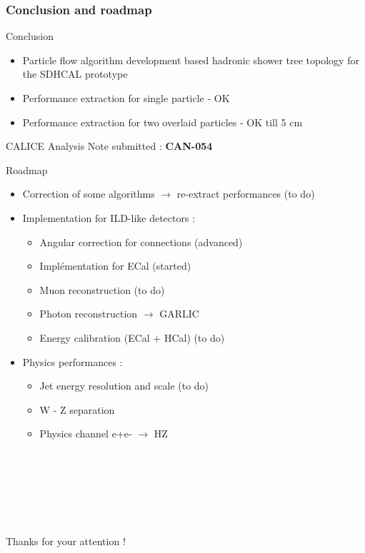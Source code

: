 \documentclass[8pt]{beamer}
\begin{document}
  \begin{frame}
  \frametitle{Conclusion and roadmap}
    \begin{block}{Conclusion}
      \begin{itemize}
        \item Particle flow algorithm development based hadronic shower tree topology for the SDHCAL prototype
        \item Performance extraction for single particle - OK
        \item Performance extraction for two overlaid particles - OK till 5 cm
      \end{itemize}
      CALICE Analysis Note submitted : \textbf{CAN-054}
    \end{block}
    \begin{block}{Roadmap}
      \begin{itemize}
        \item Correction of some algorithms $\rightarrow$ re-extract performances (to do)
        \item Implementation for ILD-like detectors :
        \begin{itemize}
          \item Angular correction for connections (advanced)
          \item Implémentation for ECal (started)
          \item Muon reconstruction (to do)
          \item Photon reconstruction $\rightarrow$ GARLIC
          \item Energy calibration (ECal + HCal) (to do)
        \end{itemize}
        \item Physics performances :
        \begin{itemize}
          \item Jet energy resolution and scale (to do)
          \item W - Z separation
          \item Physics channel e+e- $\rightarrow$ HZ
        \end{itemize}
      \end{itemize}
    \end{block}
  \end{frame}


  \begin{frame}
  ~ \\
  ~ \\
  ~ \\
  ~ \\
  ~ \\
  ~ \\
    \centering \large Thanks for your attention !
  ~ \\
  ~ \\
  ~ \\    
  \end{frame}
\end{document}
